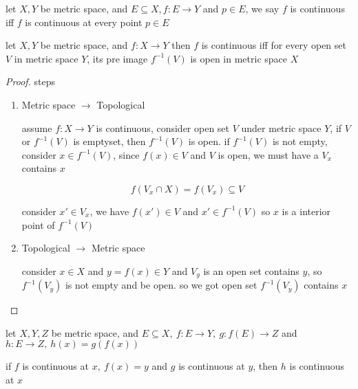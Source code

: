 \begin{definition}
    let $X,Y$ be metric space, and $E \subseteq X, f: E \to Y$ and $p \in E$, we say $f$ is continuous iff $f$
    is continuous at every point $p \in E$
\end{definition}


\begin{corollary}
    let $X,Y$ be metric space, and $f: X \to Y$ then $f$ is continuous iff for every open set $V$ in
    metric space $Y$, its pre image $f^{-1}(V)$ is open in metric space $X$
\end{corollary}

\begin{proof}
    steps

    \begin{enumerate}
        \item Metric space $\to$ Topological 

        assume $f: X \to Y$ is continuous, consider open set $V$ under metric space $Y$, if $V$ or $f^{-1}(V)$ is emptyset, then
        $f^{-1}(V)$ is open. if $f^{-1}(V)$ is not empty, consider $x \in f^{-1}(V)$, since $f(x) \in V$ and $V$ is open, we must have a $V_x$ contains $x$

        \[
            f(V_x \cap X) = f(V_x) \subseteq V
        \]

        consider $x' \in V_x$, we have $f(x') \in V$ and $x' \in f^{-1}(V)$
        so $x$ is a interior point of $f^{-1}(V)$

        \item Topological $\to$ Metric space

        consider $x \in X$ and $y = f(x) \in Y$ and $V_y$ is an open set contains $y$, so $f^{-1}(V_y)$ is not empty and be open.
        so we got open set $f^{-1}(V_y)$ contains $x$ 
    \end{enumerate}
\end{proof}

\begin{thm}
    let $X, Y, Z$ be metric space, and $E\subseteq X, \: f: E \to Y,\: g: f(E) \to Z$ and $h: E \to Z,\: h(x) = g(f(x))$

    if $f$ is continuous at $x,\: f(x) = y$ and $g$ is continuous at $y$, then $h$ is continuous at $x$
\end{thm}

